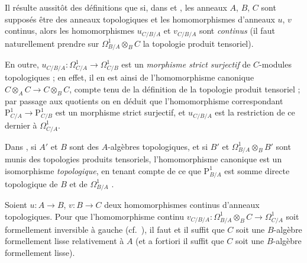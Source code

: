 \begin{env}[20.7.1]
\label{0.20.7.1-fr}
Il résulte aussitôt des définitions que si, dans  et
, les anneaux $A$, $B$, $C$ sont supposés être des anneaux
topologiques et les homomorphismes d'anneaux $u$, $v$ continus, alors les
homomorphismes $u_{C/B/A}$ et $v_{C/B/A}$ sont \emph{continus} (il faut
naturellement prendre sur $\Omega^1_{B/A}\otimes_B C$ la topologie produit
tensoriel).

En outre, $u_{C/B/A}:\Omega^1_{C/A}\to\Omega^1_{C/B}$ est un
\emph{morphisme strict surjectif} de $C$-modules topologiques ; en effet, il en
est ainsi de l'homomorphisme canonique $C\otimes_A C\to C\otimes_B C$, compte
tenu de la définition de la topologie produit tensoriel ; par passage aux
quotients on en déduit que l'homomorphisme correspondant
$\mathrm{P}^1_{C/A}\to\mathrm{P}^1_{C/B}$ est un morphisme strict surjectif,
et $u_{C/B/A}$ est la restriction de ce dernier à $\Omega^1_{C/A}$.

Dans , si $A'$ et $B$ sont des $A$-algèbres topologiques,
et si $B'$ et $\Omega^1_{B/A}\otimes_B B'$ sont munis des topologies produits
tensoriels, l'homomorphisme canonique  est un isomorphisme
\emph{topologique}, en tenant compte de ce que $\mathrm{P}^1_{B/A}$ est somme directe
topologique de $B$ et de $\Omega^1_{B/A}$ .
\end{env}

\begin{proposition}[20.7.2]
\label{0.20.7.2-fr}
Soient $u:A\to B$, $v:B\to C$ deux homomorphismes continus d'anneaux
topologiques. Pour que l'homomorphisme continu
$v_{C/B/A}:\Omega^1_{B/A}\otimes_B C\to\Omega^1_{C/A}$ soit formellement
inversible à gauche \textup{(cf.\ )}, il faut et il suffit que $C$
soit une $B$-algèbre formellement lisse relativement à $A$
\textup{} \textup{(et} a fortiori \textup{il suffit que $C$ soit une
$B$-algèbre formellement lisse)}.
\end{proposition}

